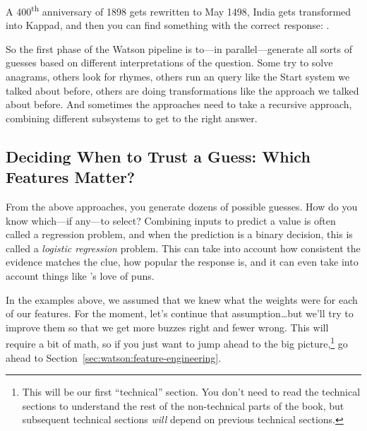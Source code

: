 A 400\textsuperscript{th} anniversary of 1898 gets rewritten to May
1498, India gets transformed into Kappad, and then you can find
something with the correct response: .

So the first phase of the Watson pipeline is to---in parallel---generate all
sorts of guesses based on different interpretations of the question.  Some try
to solve anagrams, others look for rhymes, others run an  query like the
Start system we talked about before, others are doing transformations like the
 approach we talked about before.
%
And sometimes the approaches need to take a recursive approach, combining
different subsystems to get to the right answer.

\subsection{Deciding When to Trust a Guess: Which Features Matter?}
\label{sec:watson:logistic-regression}

From the above approaches, you generate dozens of possible guesses.
%
How do you know which---if any---to select?
%
Combining inputs to predict a value is often called a regression
problem, and when the prediction is a binary decision, this is called
a \emph{logistic regression} problem.
This
can take into account how consistent the evidence matches the clue, how
popular the response is, and it can even take into account things like
\jeopardy{}’s love of puns.

In the examples above, we assumed that we knew what the weights were for each
of our features.
%
For the moment, let's continue that assumption\dots but we'll try to improve
them so that we get more buzzes right and fewer wrong.
%
This will require a bit of math, so if you just want to jump ahead to
the big picture,\footnote{This will be our first ``technical''
  section.  You don't need to read the technical sections to
  understand the rest of the non-technical parts of the book, but
  subsequent technical sections \emph{will} depend on previous
  technical sections.} go ahead to
Section~\ref{sec:watson:feature-engineering}.

